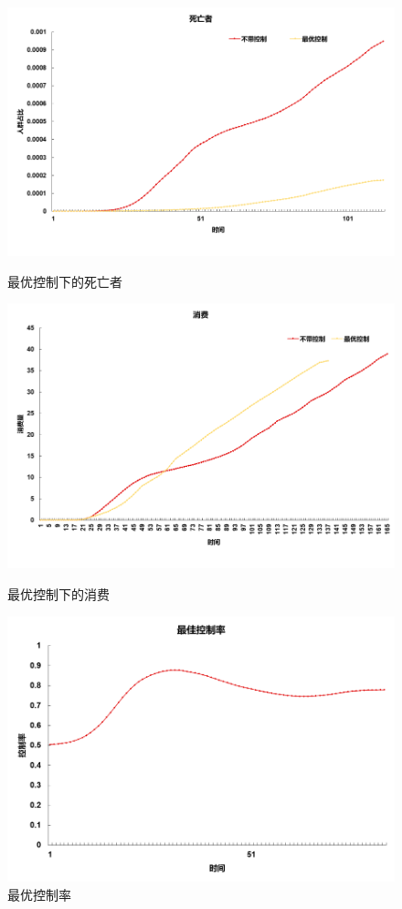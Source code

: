 \begin{figure}[htbp]
    \begin{minipage}{0.49\linewidth}
		\centering
		\includegraphics[width=0.9\linewidth]{fig/image014.png}
		\caption{最优控制下的死亡者}
		\label{fig:ima5}%
	\end{minipage}
	\begin{minipage}{0.49\linewidth}
		\centering
		\includegraphics[width=0.9\linewidth]{fig/image004.png}
		\caption{最优控制下的消费}
		\label{fig:ima6}%
	\end{minipage}

	\begin{minipage}{0.49\linewidth}
		\centering
		\includegraphics[width=0.9\linewidth]{fig/image006.png}
		\caption{最优控制率}
		\label{fig:ima7}%
	\end{minipage}
\end{figure}


